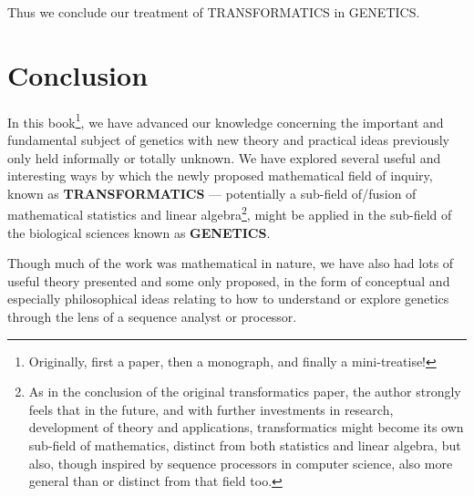 \documentclass[a4paper, 18pt]{book} %
\begin{document}
Thus we conclude our treatment of TRANSFORMATICS in GENETICS.



\chapter{Conclusion}
\label{CONC}



In this book\footnote{Originally, first a paper, then a monograph, and finally a mini-treatise!}, we have advanced our knowledge concerning the important and fundamental subject of genetics with new theory and practical ideas previously only held informally or totally unknown. We have explored several useful and interesting ways by which the newly proposed mathematical field of inquiry, known as \textbf{TRANSFORMATICS} --- potentially a sub-field of/fusion of mathematical statistics and linear algebra\footnote{As in the conclusion of the original transformatics paper\cite{transformatics}, the author strongly feels that in the future, and with further investments in research, development of theory and applications, transformatics might become its own sub-field of mathematics, distinct from both statistics and linear algebra, but also, though inspired by sequence processors in computer science, also more general than or distinct from that field too.}, might be applied in the sub-field of the biological sciences known as \textbf{GENETICS}. 

Though much of the work was mathematical in nature, we have also had lots of useful theory presented and some only proposed, in the form of conceptual and especially philosophical ideas relating to how to understand or explore genetics through the lens of a sequence analyst or processor. 
\end{document}
